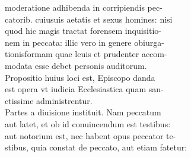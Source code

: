 \documentclass{article}
\begin{document}
\begin{pages}
                moderatione adhibenda in corripiendis pec- \\
                catorib. cuiusuis aetatis et sexus homines: nisi \\
                quod hic magis tractat forensem inquisitio- \\
                nem in peccata: illic vero in genere obiurga- \\
                tionisformam quae leuis et prudenter accom- \\
                modata esse debet personis auditorum. \\
                Propositio huius loci est, Episcopo danda \\
                est opera vt iudicia Ecclesiastica quam san- \\
                ctissime administrentur. \\
                Partes a diuisione instituit. Nam peccatum \\
                aut latet, et ob id conuincendum est testibus: \\
                aut notorium est, nec habent opus peccator te- \\
                stibus, quia constat de peccato, aut etiam fatetur: \\
                

\end{pages}
\end{document}
